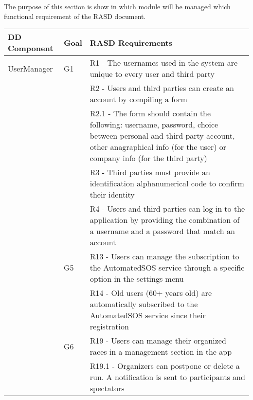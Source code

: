 
%
The purpose of this section is show in which module  will be managed which functional requirement of the RASD document.

\clearpage
\begin{table}[]
\begin{adjustbox}{width=\textwidth}
\begin{tabular}{|p{}|p{}|p{}|}
\hline
\textbf{DD Component} & \textbf{Goal} & \textbf{RASD Requirements}\\ \hline
UserManager			& G1	& R1 - The usernames used in the system are unique to every user and third party	\\
					& 		& R2 - Users and third parties can create an account by compiling a form	\\
					&		& R2.1 - The form should contain the following: username, password, choice between personal and third party account, other anagraphical info (for the user) or company info (for the third party) \\
					&		& R3 - Third parties must provide an identification alphanumerical code to confirm their identity	\\
					&		& R4 - Users and third parties can log in to the application by providing the combination of a username and a password that match an account	\\
					& G5	& R13 -	Users can manage the subscription to the AutomatedSOS service through a specific option in the settings menu\\
					&		& R14 -	Old users (60+ years old) are automatically subscribed to the AutomatedSOS service since their registration\\
					& G6	& R19 -	Users can manage their organized races in a management section in the app\\
					&		& R19.1 - Organizers can postpone or delete a run. A notification is sent to participants and spectators\\\hline

\end{tabular}
\end{adjustbox}
\end{table}
			
